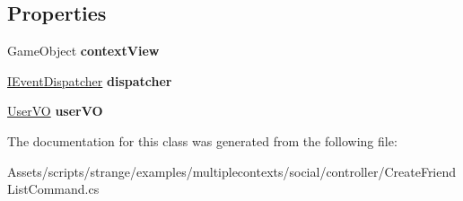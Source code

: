 \subsection*{Properties}
\begin{DoxyCompactItemize}
\item 
\hypertarget{classstrange_1_1examples_1_1multiplecontexts_1_1social_1_1_create_friend_list_command_a7e316aef7cff66e424e117092199a95a}{Game\-Object {\bfseries context\-View}}\label{classstrange_1_1examples_1_1multiplecontexts_1_1social_1_1_create_friend_list_command_a7e316aef7cff66e424e117092199a95a}

\item 
\hypertarget{classstrange_1_1examples_1_1multiplecontexts_1_1social_1_1_create_friend_list_command_aa8efe36761e392c60e7fcb04cdbbf84a}{\hyperlink{interfacestrange_1_1extensions_1_1dispatcher_1_1eventdispatcher_1_1api_1_1_i_event_dispatcher}{I\-Event\-Dispatcher} {\bfseries dispatcher}}\label{classstrange_1_1examples_1_1multiplecontexts_1_1social_1_1_create_friend_list_command_aa8efe36761e392c60e7fcb04cdbbf84a}

\item 
\hypertarget{classstrange_1_1examples_1_1multiplecontexts_1_1social_1_1_create_friend_list_command_a749520ce195945d0db6dad83cfda9413}{\hyperlink{classstrange_1_1examples_1_1multiplecontexts_1_1social_1_1_user_v_o}{User\-V\-O} {\bfseries user\-V\-O}}\label{classstrange_1_1examples_1_1multiplecontexts_1_1social_1_1_create_friend_list_command_a749520ce195945d0db6dad83cfda9413}

\end{DoxyCompactItemize}


The documentation for this class was generated from the following file\-:\begin{DoxyCompactItemize}
\item 
Assets/scripts/strange/examples/multiplecontexts/social/controller/Create\-Friend\-List\-Command.\-cs\end{DoxyCompactItemize}
